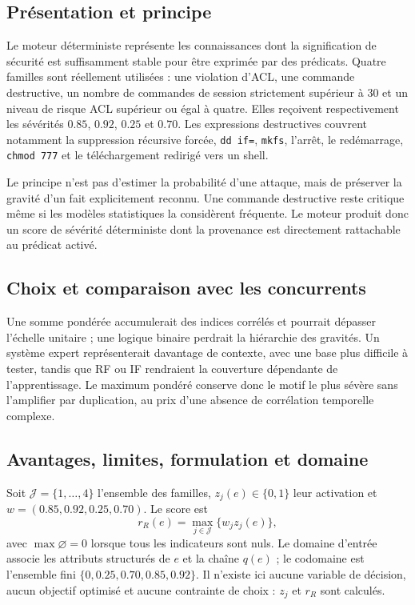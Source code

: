\documentclass[11pt,a4paper,oneside]{report}
\theoremstyle{definition}
\theoremstyle{plain}
\begin{document}
\subsection*{Présentation et principe}

Le moteur déterministe représente les connaissances dont la signification de sécurité est suffisamment stable pour être exprimée par des prédicats. Quatre familles sont réellement utilisées : une violation d'ACL, une commande destructive, un nombre de commandes de session strictement supérieur à 30 et un niveau de risque ACL supérieur ou égal à quatre. Elles reçoivent respectivement les sévérités $0.85$, $0.92$, $0.25$ et $0.70$. Les expressions destructives couvrent notamment la suppression récursive forcée, \texttt{dd if=}, \texttt{mkfs}, l'arrêt, le redémarrage, \texttt{chmod 777} et le téléchargement redirigé vers un shell.

Le principe n'est pas d'estimer la probabilité d'une attaque, mais de préserver la gravité d'un fait explicitement reconnu. Une commande destructive reste critique même si les modèles statistiques la considèrent fréquente. Le moteur produit donc un score de sévérité déterministe dont la provenance est directement rattachable au prédicat activé.

\subsection*{Choix et comparaison avec les concurrents}

Une somme pondérée accumulerait des indices corrélés et pourrait dépasser l'échelle unitaire ; une logique binaire perdrait la hiérarchie des gravités. Un système expert représenterait davantage de contexte, avec une base plus difficile à tester, tandis que RF ou IF rendraient la couverture dépendante de l'apprentissage. Le maximum pondéré conserve donc le motif le plus sévère sans l'amplifier par duplication, au prix d'une absence de corrélation temporelle complexe.

\subsection*{Avantages, limites, formulation et domaine}

Soit $\mathcal{J}=\{1,\ldots,4\}$ l'ensemble des familles, $z_j(e)\in\{0,1\}$ leur activation et
$w=(0.85,0.92,0.25,0.70)$. Le score est
\begin{equation}
r_R(e)=\max_{j\in\mathcal{J}}\{w_jz_j(e)\},
\label{eq:ai-ro-rules}
\end{equation}
avec $\max\varnothing=0$ lorsque tous les indicateurs sont nuls. Le domaine d'entrée associe les attributs structurés de $e$ et la chaîne $q(e)$ ; le codomaine est l'ensemble fini $\{0,0.25,0.70,0.85,0.92\}$. Il n'existe ici aucune variable de décision, aucun objectif optimisé et aucune contrainte de choix : $z_j$ et $r_R$ sont calculés.
\end{document}
